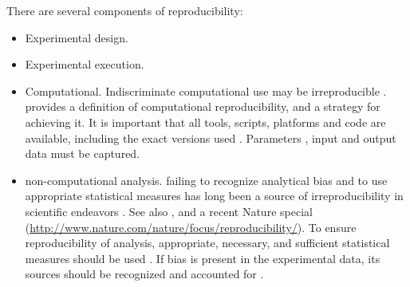 There are several components of reproducibility: 
\begin{itemize}

  \item Experimental design.

  \item Experimental execution.

  \item Computational.  Indiscriminate computational use may be irreproducible \cite{donoho2009, peng2011reproducible}.  
    \cite{donoho_wavelab} provides a definition of computational reproducibility, and a strategy for achieving it.
    It is important that all tools, scripts, platforms and code are available, including the exact versions used
    \cite{ince2012open, nekrutenko2012next, blankenberg2014dissemination}.
    Parameters \cite{landis2012call}, input and output data must be captured.

  \item non-computational analysis.  failing to recognize analytical bias and to 
    use appropriate statistical measures has long been a source of 
    irreproducibility in scientific endeavors \cite{sackett1979bias}.
    See also \cite{ioannidis2005most, nuzzo2014statistical, begley2013reproducibility}, 
    and a recent Nature special (\url{http://www.nature.com/nature/focus/reproducibility/}).
    To ensure reproducibility of analysis, appropriate, necessary, and sufficient
    statistical measures should be used \cite{pashler2012replicability, vaux2012numbers}.
    If bias is present in the experimental data, its sources should be recognized
    and accounted for \cite{macarthur2012reproducibility, wagenmakers2012agenda}.

\end{itemize}




